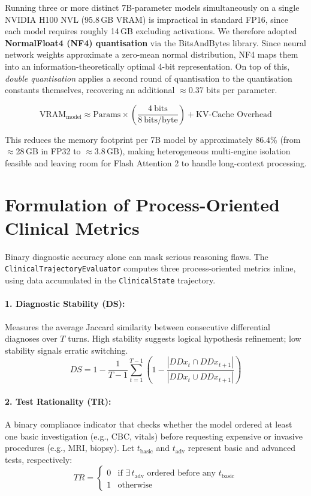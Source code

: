 Running three or more distinct 7B-parameter models simultaneously on a single NVIDIA H100 NVL (95.8\,GB VRAM) is impractical in standard FP16, since each model requires roughly 14\,GB excluding activations. We therefore adopted \textbf{NormalFloat4 (NF4) quantisation} via the BitsAndBytes library. Since neural network weights approximate a zero-mean normal distribution, NF4 maps them into an information-theoretically optimal 4-bit representation. On top of this, \textit{double quantisation} applies a second round of quantisation to the quantisation constants themselves, recovering an additional $\approx$0.37 bits per parameter.

\begin{equation}
\text{VRAM}_{\text{model}} \approx \text{Params} \times \left( \frac{4\ \text{bits}}{8\ \text{bits/byte}} \right) + \text{KV-Cache Overhead}
\end{equation}

This reduces the memory footprint per 7B model by approximately 86.4\% (from $\approx$28\,GB in FP32 to $\approx$3.8\,GB), making heterogeneous multi-engine isolation feasible and leaving room for Flash Attention 2 to handle long-context processing.

\section{Formulation of Process-Oriented Clinical Metrics}

Binary diagnostic accuracy alone can mask serious reasoning flaws. The \texttt{ClinicalTrajectoryEvaluator} computes three process-oriented metrics inline, using data accumulated in the \texttt{ClinicalState} trajectory.

\paragraph{1. Diagnostic Stability (DS):} Measures the average Jaccard similarity between consecutive differential diagnoses over $T$ turns. High stability suggests logical hypothesis refinement; low stability signals erratic switching.
\begin{equation}
DS = 1 - \frac{1}{T - 1} \sum_{t=1}^{T-1} \left( 1 - \frac{|DDx_t \cap DDx_{t+1}|}{|DDx_t \cup DDx_{t+1}|} \right)
\end{equation}

\paragraph{2. Test Rationality (TR):} A binary compliance indicator that checks whether the model ordered at least one basic investigation (e.g., CBC, vitals) before requesting expensive or invasive procedures (e.g., MRI, biopsy). Let $t_{\text{basic}}$ and $t_{\text{adv}}$ represent basic and advanced tests, respectively:
\begin{equation}
TR = \begin{cases}
0 & \text{if } \exists\, t_{\text{adv}} \text{ ordered before any } t_{\text{basic}} \\
1 & \text{otherwise}
\end{cases}
\end{equation}

